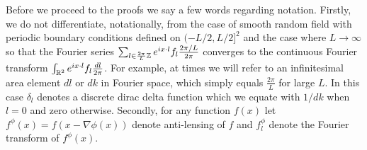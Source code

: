 \documentclass[noinfoline]{imsart}
\begin{document}
Before we proceed to the proofs we say a few words regarding notation.
Firstly, we do not differentiate, notationally, from the case of smooth random field with periodic boundary conditions defined on $(-L/2, L/2]^2$ and the case where $L\rightarrow \infty$ so that the Fourier series $\sum_{l \in \frac{2\pi}{L}\Bbb Z }   e^{i x\cdot l}  f_l \frac{2\pi/ L}{2\pi} $ converges to the continuous Fourier transform $\int_{\Bbb R^2}  e^{i x\cdot l}  f_l \frac{dl}{2\pi} $. %
For example, at times we will refer to an infinitesimal area element $dl$ or $dk$ in Fourier space, which simply equals $\frac{2\pi}{L}$ for large $L$. In this case $\delta_l$ denotes a discrete dirac delta function which we equate with $1/dk$ when $l=0$ and zero otherwise. 
Secondly, for any function $f(x)$ let $f^\phi(x) = f(x-\nabla \phi(x))$ denote anti-lensing of $f$ and $f^\phi_l$ denote the Fourier transform of  $f^\phi(x)$.
\end{document}
